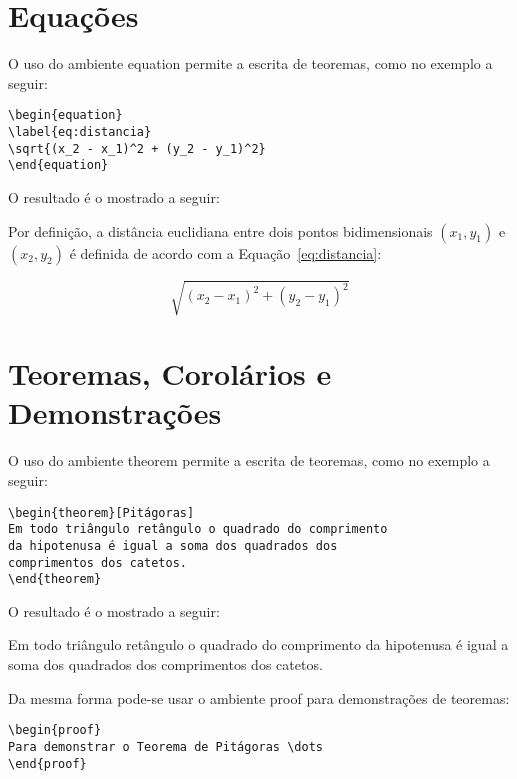 \section{Equações}
\label{sec:eq}

O uso do ambiente \textsf{equation} permite a escrita de teoremas, como no exemplo a seguir:
\begin{verbatim}
\begin{equation}
\label{eq:distancia}    
\sqrt{(x_2 - x_1)^2 + (y_2 - y_1)^2}
\end{equation}
\end{verbatim}

O resultado é o mostrado a seguir:

Por definição, a distância euclidiana entre dois pontos bidimensionais  $(x_{1},y_{1})$ e $(x_{2},y_{2})$ é definida de acordo com a Equação~\ref{eq:distancia}:

\begin{equation}
\label{eq:distancia}    
\sqrt{(x_2 - x_1)^2 + (y_2 - y_1)^2}
\end{equation}

\section{Teoremas, Corolários e Demonstrações}
\label{sec:teor}
 O uso do ambiente \textsf{theorem} permite a escrita de teoremas, como no exemplo a seguir:
\begin{verbatim}
\begin{theorem}[Pitágoras]
Em todo triângulo retângulo o quadrado do comprimento
da hipotenusa é igual a soma dos quadrados dos
comprimentos dos catetos.
\end{theorem}
\end{verbatim}

O resultado é o mostrado a seguir:

\begin{theorem}[Pitágoras]
Em todo triângulo retângulo o quadrado do comprimento da hipotenusa é igual a soma dos quadrados dos comprimentos dos catetos.
\end{theorem}

Da mesma forma pode-se usar o ambiente \textsf{proof} para demonstrações de teoremas:
\begin{verbatim}
\begin{proof}
Para demonstrar o Teorema de Pitágoras \dots
\end{proof}
\end{verbatim}

